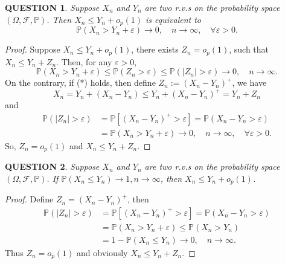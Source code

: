\documentclass[12pt]{article}
\renewcommand{\(}{\left(}%
\renewcommand{\)}{\right)}%
\renewcommand{\[}{\left[}%
\renewcommand{\]}{\right]}%
\newcommand{\p}{\mathbb{P}}
\newcommand{\f}{\mathscr{F}}
\newtheorem{question}{QUESTION}[section]}
\newtheorem{proof}{Proof.}}
\begin{document}
  	\begin{question}
  		Suppose $X_n$ and $Y_n$ are two r.v.s on the probability space $(\Omega,\f,\p)$. Then $X_n\leq Y_n+o_p(1)$ is equivalent to 
  		\begin{equation*}
  			\p(X_n>Y_n+\varepsilon)\to 0,\quad n\to\infty,\quad \forall \varepsilon>0. \tag{$*$}
  		\end{equation*}
  	\end{question}
  	\begin{proof}
  		Suppose $X_n\leq Y_n+o_p(1)$, there exists $Z_n=o_p(1)$, such that $X_n\leq Y_n+Z_n$. Then, for any $\varepsilon>0$,
  		\begin{equation*}
  			\p(X_n>Y_n+\varepsilon)\leq \p(Z_n>\varepsilon)\leq \p(|Z_n|>\varepsilon)\to0,\quad n\to\infty.
  		\end{equation*}
  		On the contrary, if ($*$) holds, then define $Z_n:=(X_n-Y_n)^+$, we have 
  		\begin{equation*}
  			X_n=Y_n+(X_n-Y_n)\leq Y_n+(X_n-Y_n)^+=Y_n+Z_n
  		\end{equation*}
  		and
  		\begin{equation*}
  			\begin{split}
  				\p(|Z_n|>\varepsilon)&=\p[(X_n-Y_n)^+>\varepsilon]=\p(X_n-Y_n>\varepsilon)\\
  				&=\p(X_n>Y_n+\varepsilon)\to0,\quad n\to\infty,\quad \forall \varepsilon>0.
  			\end{split}
  		\end{equation*}
  		So, $Z_n=o_p(1)$ and $X_n\leq Y_n+Z_n$.
  	\end{proof}
  	
  	\begin{question}
  		Suppose $X_n$ and $Y_n$ are two r.v.s on the probability space $(\Omega,\f,\p)$. If $\p(X_n\leq Y_n)\to 1,n\to\infty$, then $X_n\leq Y_n+o_p(1)$.
  	\end{question}
	\begin{proof}
		Define $Z_n=(X_n-Y_n)^+$, then
		\begin{equation*}
			\begin{split}
				\p(|Z_n|>\varepsilon)&=\p[(X_n-Y_n)^+>\varepsilon]=\p(X_n-Y_n>\varepsilon)\\
				&=\p(X_n>Y_n+\varepsilon)\leq \p(X_n>Y_n)\\
				&=1-\p(X_n\leq Y_n)\to0,\quad n\to\infty.
			\end{split}
		\end{equation*}
		Thus $Z_n=o_p(1)$ and obviously $X_n\leq Y_n+Z_n$.
	\end{proof}
	
\end{document}
